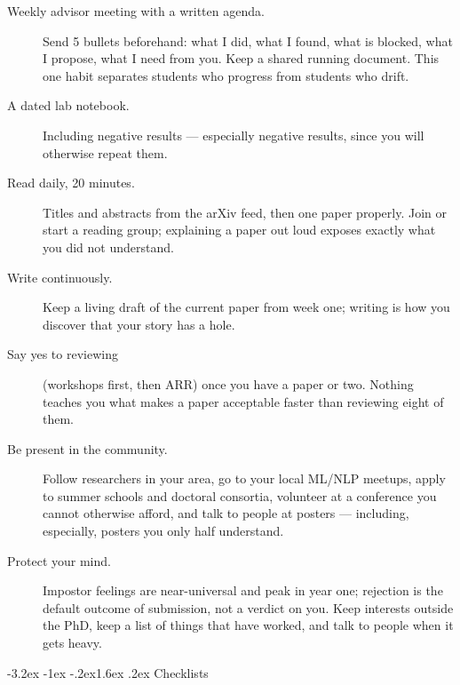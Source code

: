 \documentclass[11pt,a4paper]{article}
\makeatletter
\renewcommand\section{\@startsection{section}{1}{\z@}%
  {-3.2ex \@plus -1ex \@minus -.2ex}{1.6ex \@plus.2ex}%
  {\normalfont\Large\bfseries\color{brand}}}
\makeatother
\begin{document}
\begin{description}
  \item[Weekly advisor meeting with a written agenda.] Send 5 bullets
        beforehand: what I did, what I found, what is blocked, what I propose,
        what I need from you. Keep a shared running document. This one habit
        separates students who progress from students who drift.
  \item[A dated lab notebook.] Including negative results --- especially
        negative results, since you will otherwise repeat them.
  \item[Read daily, 20 minutes.] Titles and abstracts from the arXiv feed,
        then one paper properly. Join or start a reading group; explaining a
        paper out loud exposes exactly what you did not understand.
  \item[Write continuously.] Keep a living draft of the current paper from
        week one; writing is how you discover that your story has a hole.
  \item[Say yes to reviewing] (workshops first, then ARR) once you have a
        paper or two. Nothing teaches you what makes a paper acceptable faster
        than reviewing eight of them.
  \item[Be present in the community.] Follow researchers in your area, go to
        your local ML/NLP meetups, apply to summer schools and doctoral
        consortia, volunteer at a conference you cannot otherwise afford, and
        talk to people at posters --- including, especially, posters you only
        half understand.
  \item[Protect your mind.] Impostor feelings are near-universal and peak in
        year one; rejection is the default outcome of submission, not a verdict
        on you. Keep interests outside the PhD, keep a list of things that have
        worked, and talk to people when it gets heavy.
\end{description}

\section{Checklists}
\end{document}

